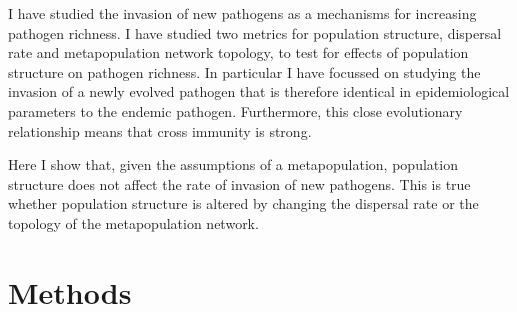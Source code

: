 
I have studied the invasion of new pathogens as a mechanisms for increasing pathogen richness.
I have studied two metrics for population structure, dispersal rate and metapopulation network topology, to test for effects of population structure on pathogen richness.
In particular I have focussed on studying the invasion of a newly evolved pathogen that is therefore identical in epidemiological parameters to the endemic pathogen.
Furthermore, this close evolutionary relationship means that cross immunity is strong.


Here I show that, given the assumptions of a metapopulation, population structure does not affect the rate of invasion of new pathogens.
This is true whether population structure is altered by changing the dispersal rate or the topology of the metapopulation network.






\section{Methods}



